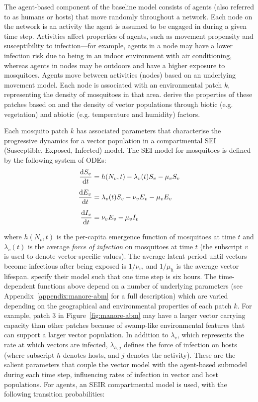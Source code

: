 The agent-based component of the baseline model consists of agents (also referred to as humans or hosts) that move randomly throughout a network. Each node on the network is an activity the agent is assumed to be engaged in during a given time step. Activities affect properties of agents, such as movement propensity and susceptibility to infection---for example, agents in a  node may have a lower infection risk due to being in an indoor environment with air conditioning, whereas agents in  nodes may be outdoors and have a higher exposure to mosquitoes. Agents move between activities (nodes) based on an underlying movement model. Each node is associated with an environmental patch $k$, representing the density of mosquitoes in that area. \citet{manore_network-patch_2015} derive the properties of these patches based on  and the density of vector populations through biotic (e.g. vegetation) and abiotic (e.g. temperature and humidity) factors.

Each mosquito patch $k$ has associated parameters that characterise the progressive dynamics for a vector population in a compartmental SEI (Susceptible, Exposed, Infected) model. The SEI model for mosquitoes is defined by the following system of ODEs:
\begin{equation} \label{eq:mosquito}
\begin{split}
\odv{S_v}{t}&=h(N_v, t)-\lambda_v(t) S_v - \mu_v S_v \\[5pt]
\odv{E_v}{t}&=\lambda_v(t) S_v - \nu_v E_v - \mu_v E_v \\[5pt]
\odv{I_v}{t}&=\nu_v E_v - \mu_v I_v
\end{split}
\end{equation}

where $h(N_v,t)$ is the per-capita emergence function of mosquitoes at time $t$ and $\lambda_v(t)$ is the average \textit{force of infection} on mosquitoes at time $t$ (the subscript $v$ is used to denote vector-specific values). The average latent period until vectors become infectious after being exposed is $1/\nu_v$, and $1/\mu_h$ is the average vector lifespan. \citet{manore_network-patch_2015} specify their model such that one time step is six hours. The time-dependent functions above depend on a number of underlying parameters (see Appendix~\ref{appendix:manore-abm} for a full description) which are varied depending on the geographical and environmental properties of each patch $k$. For example, patch 3 in Figure~\ref{fig:manore-abm} may have a larger vector carrying capacity than other patches because of swamp-like environmental features that can support a larger vector population. In addition to $\lambda_v$, which represents the rate at which vectors are infected, $\lambda_{h,j}$ defines the force of infection on hosts (where subscript $h$ denotes hosts, and $j$ denotes the activity). These are the salient parameters that couple the vector model with the agent-based submodel during each time step, influencing rates of infection in vector and host populations. For agents, an SEIR compartmental model is used, with the following transition probabilities:

